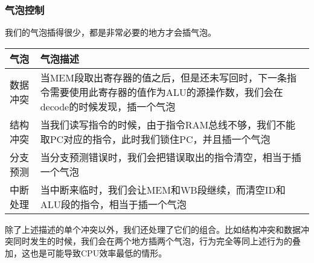 \subsubsection{气泡控制}

我们的气泡插得很少，都是非常必要的地方才会插气泡。

\begin{center}
    \label{table:bubble}
    \begin{longtable}{p{}p{}}
        \toprule
        气泡 & 气泡描述 \\
        \midrule
        数据冲突 & 当MEM段取出寄存器的值之后，但是还未写回时，下一条指令需要使用此寄存器的值作为ALU的源操作数，我们会在decode的时候发现，插一个气泡\\
        结构冲突 & 当我们读写指令的时候，由于指令RAM总线不够，我们不能取PC对应的指令，此时我们锁住PC，并且插一个气泡\\
        分支预测 & 当分支预测错误时，我们会把错误取出的指令清空，相当于插一个气泡\\
        中断处理 & 当中断来临时，我们会让MEM和WB段继续，而清空ID和ALU段的指令，相当于插一个气泡\\
        \bottomrule
    \end{longtable}
\end{center}

除了上述描述的单个冲突以外，我们还处理了它们的组合。比如结构冲突和数据冲突同时发生的时候，我们会在两个地方插两个气泡，行为完全等同上述行为的叠加，这也是可能导致CPU效率最低的情形。